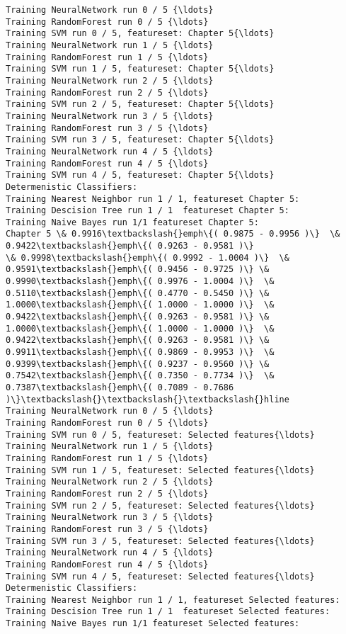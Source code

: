 \documentclass[11pt]{article}
\begin{document}
\begin{Verbatim}[commandchars=\\\{\}]
Training NeuralNetwork run 0 / 5 {\ldots}
Training RandomForest run 0 / 5 {\ldots}
Training SVM run 0 / 5, featureset: Chapter 5{\ldots}
Training NeuralNetwork run 1 / 5 {\ldots}
Training RandomForest run 1 / 5 {\ldots}
Training SVM run 1 / 5, featureset: Chapter 5{\ldots}
Training NeuralNetwork run 2 / 5 {\ldots}
Training RandomForest run 2 / 5 {\ldots}
Training SVM run 2 / 5, featureset: Chapter 5{\ldots}
Training NeuralNetwork run 3 / 5 {\ldots}
Training RandomForest run 3 / 5 {\ldots}
Training SVM run 3 / 5, featureset: Chapter 5{\ldots}
Training NeuralNetwork run 4 / 5 {\ldots}
Training RandomForest run 4 / 5 {\ldots}
Training SVM run 4 / 5, featureset: Chapter 5{\ldots}
Determenistic Classifiers:
Training Nearest Neighbor run 1 / 1, featureset Chapter 5:
Training Descision Tree run 1 / 1  featureset Chapter 5:
Training Naive Bayes run 1/1 featureset Chapter 5:
Chapter 5 \& 0.9916\textbackslash{}emph\{( 0.9875 - 0.9956 )\}  \& 0.9422\textbackslash{}emph\{( 0.9263 - 0.9581 )\}
\& 0.9998\textbackslash{}emph\{( 0.9992 - 1.0004 )\}  \& 0.9591\textbackslash{}emph\{( 0.9456 - 0.9725 )\} \&
0.9990\textbackslash{}emph\{( 0.9976 - 1.0004 )\}  \& 0.5110\textbackslash{}emph\{( 0.4770 - 0.5450 )\} \&
1.0000\textbackslash{}emph\{( 1.0000 - 1.0000 )\}  \& 0.9422\textbackslash{}emph\{( 0.9263 - 0.9581 )\} \&
1.0000\textbackslash{}emph\{( 1.0000 - 1.0000 )\}  \& 0.9422\textbackslash{}emph\{( 0.9263 - 0.9581 )\} \&
0.9911\textbackslash{}emph\{( 0.9869 - 0.9953 )\}  \& 0.9399\textbackslash{}emph\{( 0.9237 - 0.9560 )\} \&
0.7542\textbackslash{}emph\{( 0.7350 - 0.7734 )\}  \& 0.7387\textbackslash{}emph\{( 0.7089 - 0.7686 )\}\textbackslash{}\textbackslash{}\textbackslash{}hline
Training NeuralNetwork run 0 / 5 {\ldots}
Training RandomForest run 0 / 5 {\ldots}
Training SVM run 0 / 5, featureset: Selected features{\ldots}
Training NeuralNetwork run 1 / 5 {\ldots}
Training RandomForest run 1 / 5 {\ldots}
Training SVM run 1 / 5, featureset: Selected features{\ldots}
Training NeuralNetwork run 2 / 5 {\ldots}
Training RandomForest run 2 / 5 {\ldots}
Training SVM run 2 / 5, featureset: Selected features{\ldots}
Training NeuralNetwork run 3 / 5 {\ldots}
Training RandomForest run 3 / 5 {\ldots}
Training SVM run 3 / 5, featureset: Selected features{\ldots}
Training NeuralNetwork run 4 / 5 {\ldots}
Training RandomForest run 4 / 5 {\ldots}
Training SVM run 4 / 5, featureset: Selected features{\ldots}
Determenistic Classifiers:
Training Nearest Neighbor run 1 / 1, featureset Selected features:
Training Descision Tree run 1 / 1  featureset Selected features:
Training Naive Bayes run 1/1 featureset Selected features:

\end{Verbatim}
\end{document}
